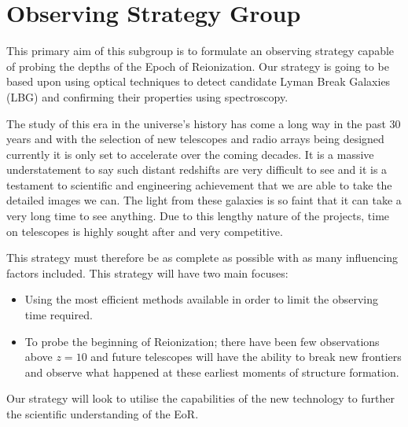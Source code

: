 \section{Observing Strategy Group} %
\label{sec:observing_strategy_group}
	This primary aim of this subgroup is to formulate an observing strategy capable of probing the depths of the Epoch of Reionization. Our strategy is going to be based upon using optical techniques to detect candidate Lyman Break Galaxies (LBG) and confirming their properties using spectroscopy.

	The study of this era in the universe’s history has come a long way in the past 30 years and with the selection of new telescopes and radio arrays being designed currently it is only set to accelerate over the coming decades. It is a massive understatement to say such distant redshifts are very difficult to see and it is a testament to scientific and engineering achievement that we are able to take the detailed images we can. The light from these galaxies is so faint that it can take a very long time to see anything. Due to this lengthy nature of the projects, time on telescopes is highly sought after and very competitive.

	This strategy must therefore be as complete as possible with as many influencing factors included. This strategy will have two main focuses:
	\begin{itemize}
		\item Using the most efficient methods available in order to limit the observing time required.
		\item To probe the beginning of Reionization; there have been few observations above $z=10$ and future telescopes will have the ability to break new frontiers and observe what happened at these earliest moments of structure formation. 
	\end{itemize}

	Our strategy will look to utilise the capabilities of the new technology to further the scientific understanding of the EoR.
	
